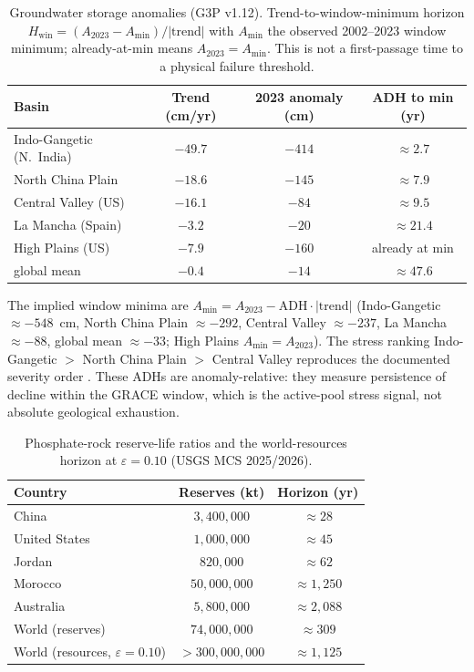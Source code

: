 \documentclass[11pt]{article}
\theoremstyle{definition}
\begin{document}
\begin{table}[t]
\centering\small
\caption{Groundwater storage anomalies (G3P v1.12). Trend-to-window-minimum horizon $H_{\mathrm{win}}=(A_{2023}-A_{\min})/|\mathrm{trend}|$ with $A_{\min}$ the observed 2002--2023 window minimum; already-at-min means $A_{2023}=A_{\min}$. This is not a first-passage time to a physical failure threshold.}
\label{tab:adh-gw}
\begin{tabular}{lccc}
\toprule
Basin & Trend (cm/yr) & 2023 anomaly (cm) & ADH to min (yr) \\
\midrule
Indo-Gangetic (N.\ India) & $-49.7$ & $-414$ & $\approx 2.7$ \\
North China Plain & $-18.6$ & $-145$ & $\approx 7.9$ \\
Central Valley (US) & $-16.1$ & $-84$ & $\approx 9.5$ \\
La Mancha (Spain) & $-3.2$ & $-20$ & $\approx 21.4$ \\
High Plains (US) & $-7.9$ & $-160$ & already at min \\
global mean & $-0.4$ & $-14$ & $\approx 47.6$ \\
\bottomrule
\end{tabular}
\end{table}

The implied window minima are $A_{\min}=A_{2023}-\mathrm{ADH}\cdot|\mathrm{trend}|$ (Indo-Gangetic $\approx-548$~cm, North China Plain $\approx-292$, Central Valley $\approx-237$, La Mancha $\approx-88$, global mean $\approx-33$; High Plains $A_{\min}=A_{2023}$). The stress ranking Indo-Gangetic $>$ North China Plain $>$ Central Valley reproduces the documented severity order \cite{rodell2018,gleeson2012}. These ADHs are anomaly-relative: they measure persistence of decline within the GRACE window, which is the active-pool stress signal, not absolute geological exhaustion.

\begin{table}[t]
\centering\small
\caption{Phosphate-rock reserve-life ratios and the world-resources horizon at $\varepsilon=0.10$ (USGS MCS 2025/2026).}
\label{tab:adh-phos}
\begin{tabular}{lcc}
\toprule
Country & Reserves (kt) & Horizon (yr) \\
\midrule
China & $3{,}400{,}000$ & $\approx 28$ \\
United States & $1{,}000{,}000$ & $\approx 45$ \\
Jordan & $820{,}000$ & $\approx 62$ \\
Morocco & $50{,}000{,}000$ & $\approx 1{,}250$ \\
Australia & $5{,}800{,}000$ & $\approx 2{,}088$ \\
\midrule
World (reserves) & $74{,}000{,}000$ & $\approx 309$ \\
World (resources, $\varepsilon=0.10$) & $>300{,}000{,}000$ & $\approx 1{,}125$ \\
\bottomrule
\end{tabular}
\end{table}
\end{document}
